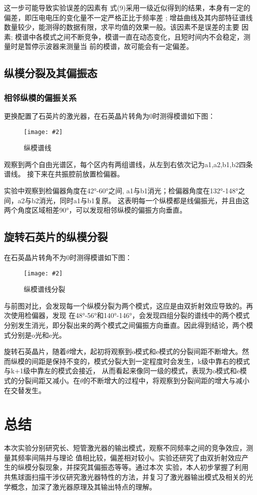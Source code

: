 \documentclass[12pt,a4paper]{article}
\newcommand{\bfig}[3]{
    \begin{figure}[H]
        \centering
        \texttt{[image: \#2]}
        \caption{#3}
    \end{figure}
}
\begin{document}
这一步可能导致实验误差的因素有
式(9)采用一级近似得到的结果，本身有一定的偏差，即压电电压的变化量不一定严格正比于频率差
; 增益曲线及其内部特征谱线数量较少，能测得的数据有限，求平均值的效果一般。该因素不是误差的主要
因素; 模谱中各模式之间不断竞争，模谱一直在动态变化，且短时间内不会稳定，测量时是暂停示波器来测量当
前的模谱，故可能会有一定偏差。
\subsection{纵模分裂及其偏振态}
\subsubsection{相邻纵模的偏振关系}
更换配置了石英片的激光器，在石英晶片转角为0时测得模谱如下图：
\bfig{0.7}{偏振谱.jpeg}{纵模谱线}
观察到两个自由光谱区，每个区内有两组谱线，从左到右依次记为a1,a2,b1,b2四条谱线。
接下来在共振腔前放置检偏器。

实验中观察到检偏器角度在42°-60°之间, a1与b1消光；检偏器角度在132°-148°之间，a2与b2消光，同时a1与b1复原。
这表明每一个纵模都是线偏振光，并且由这两个角度区域相差90°，可以发现相邻纵模的偏振方向垂直。
\subsection{旋转石英片的纵模分裂}
在石英晶片转角不为0时测得模谱如下图：
\bfig{0.7}{偏振分裂.jpeg}{纵模谱线分裂}
与前图对比，会发现每一个纵模分裂为两个模式，这应是由双折射效应导致的。再次使用检偏器，发现
在48°-56°和140°-146°，会发现四组分裂的谱线中的两个模式分别发生消光，即分裂出来的两个模式之间偏振方向垂直。因此得到结论，两个模式分别是o光和e光。

旋转石英晶片，随着$\theta$增大，起初将观察到o模式和e模式的分裂间距不断增大。然而纵模的间距是保持不变的，模式分裂大到一定程度时会发生，k级中靠右的模式与k+1级中靠左的模式会接近，
从而看起来像同一级的模式，表现为o模式和e模式的分裂间距又减小。在$\theta$的不断增大的过程中，将观察到分裂间距的增大与减小在交替发生。
\section{总结}
本次实验分别研究长、短管激光器的输出模式，观察不同频率之间的竞争效应，测量其频率间隔并与理论
值相比较，偏差相对较小。实验还研究了由双折射效应产生的纵模分裂现象，并探究其偏振态等等。通过本次
实验，本人初步掌握了利用共焦球面扫描干涉仪研究激光器特性的方法，并复习了激光器输出模式及相关的光
学概念，加深了激光器原理及其输出特点的理解。


\printbibliography
\end{document}
